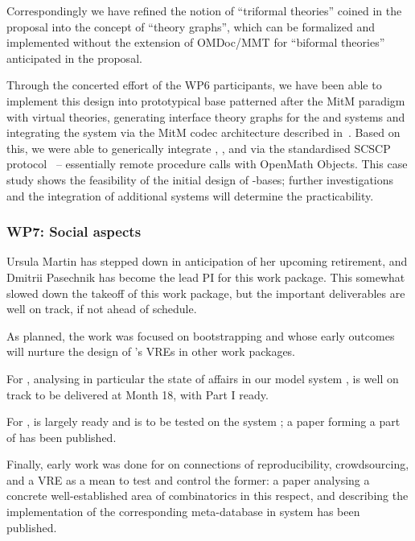 \documentclass{deliverablereport}
\begin{document}
Correspondingly we have refined the notion of ``triformal theories'' coined in the
proposal into the concept of ``\DKS theory graphs'', which can be formalized and
implemented without the extension of OMDoc/MMT for ``biformal theories'' anticipated in
the proposal.

Through the concerted effort of the WP6 participants, we have been able to implement
this design into prototypical \DKS base patterned after the MitM paradigm with virtual
theories, generating interface theory graphs for the \GAP and \Sage systems and
integrating the \LMFDB system via the MitM codec architecture described
in~\cite{ODK-D6.2}. Based on this, we were able to generically integrate \GAP, \Sage, and
\LMFDB via the standardised SCSCP protocol~\cite{HorRoz:ossp09} -- essentially remote
procedure calls with OpenMath Objects. This case study shows the feasibility of the
initial design of \DKS-bases; further investigations and the integration of additional
systems will determine the practicability.

\subsubsection{WP7: Social aspects}

Ursula Martin has stepped down in anticipation of her upcoming retirement, and Dmitrii Pasechnik has
become the lead PI for this work package.
This somewhat slowed down the takeoff of this work package, but the
important deliverables are well on track, if not ahead of schedule.

As planned, the work was focused on bootstrapping
 and
 whose early
outcomes will nurture the design of \ODK's VREs in other work
packages.

For ,
 analysing in
particular the state of affairs in our model system \Sage, is well on
track to be delivered at Month 18, with Part I ready.

For ,
 is largely ready and is to
be tested on the system \Sage; a paper
\cite{Pavlou:2016:MCI:2936924.2936934} forming a part of
 has been published.

Finally, early work was done for
 on connections of
reproducibility, crowdsourcing, and a VRE as a mean to test and
control the former: a paper \cite{2016arXiv160100181C} analysing a
concrete well-established area of combinatorics in this respect, and
describing the implementation of the corresponding meta-database in
\Sage system has been published.
\end{document}
